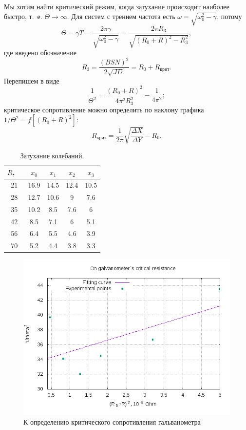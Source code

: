 \documentclass{lab_class}
\begin{document}
Мы хотим найти критический режим, когда затухание происходит наиболее быстро, т.~е. $\Theta \to \infty$. Для систем с трением частота есть $\omega = \sqrt{\omega_0^2 - \gamma}$, потому
\begin{equation*}
	\Theta = \gamma T = \frac{2\pi\gamma}{\sqrt{\omega_0^2 - \gamma}} = \frac{2\pi R_3}{\sqrt{(R_0+R)^2 - R_3^2}},
\end{equation*} 
где введено обозначение
\begin{equation*}
	R_3 = \frac{(BSN)^2}{2\sqrt{JD}} = R_0 + R_{\text{крит}}.
\end{equation*}
Перепишем в виде
\begin{equation*}
	\frac{1}{\Theta^2} = \frac{(R_0+R)^2}{4\pi^2 R_3^2} - \frac{1}{4\pi^2};
\end{equation*}
критическое сопротивление можно определить по наклону графика $1/\Theta^2 = f[(R_0+R)^2]$:
\begin{equation*}
	R_{\text{крит}} = \frac{1}{2\pi} \sqrt{\frac{\Delta X}{\Delta Y}} - R_0.
\end{equation*}

\begin{table}[H]
	\centering
	\begin{tabular}{|c|c|c|c|c|}
		\hline
		$R$, \ \sk \Ohm & $x_0$ & $x_1$ & $x_2$ & $x_3$ \\ \hline
		21 & 16.9 & 14.5 & 12.4 & 10.5 \\ \hline
		28 & 12.7 & 10.6 & 9 & 7.6 \\ \hline
		35 & 10.2 & 8.5 & 7.6 & 6 \\ \hline
		42 & 8.5 & 7.1 & 6 & 5.1 \\ \hline
		56 & 6.4 & 5.5 & 4.6 & 3.9 \\ \hline
		70 & 5.2 & 4.4 & 3.8 & 3.3 \\ \hline
	\end{tabular}
	\caption{Затухание колебаний.}
\end{table}

\begin{figure}[H]
	\centering
	\includegraphics[width = 0.87 \textwidth]{critical_resistance.png}
	\caption{К определению критического сопротивления гальванометра}
\end{figure}
\end{document}
